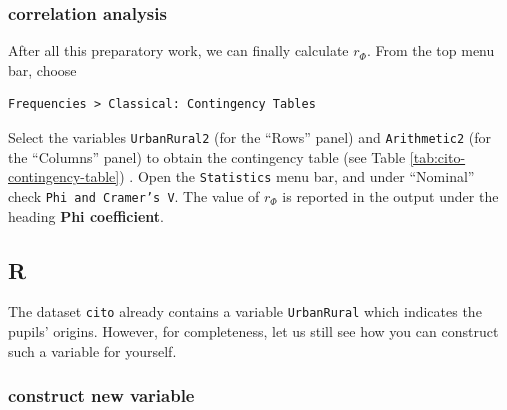 \documentclass[
]{book}
\newenvironment{Shaded}{\begin{snugshade}}{\end{snugshade}}
\newcommand{\CommentTok}[1]{\textcolor[rgb]{0.56,0.35,0.01}{\textit{#1}}}
\newcommand{\DecValTok}[1]{\textcolor[rgb]{0.00,0.00,0.81}{#1}}
\newcommand{\FunctionTok}[1]{\textcolor[rgb]{0.13,0.29,0.53}{\textbf{#1}}}
\newcommand{\NormalTok}[1]{#1}
\newcommand{\OtherTok}[1]{\textcolor[rgb]{0.56,0.35,0.01}{#1}}
\newcommand{\SpecialCharTok}[1]{\textcolor[rgb]{0.81,0.36,0.00}{\textbf{#1}}}
\begin{document}
\hypertarget{correlation-analysis-1}{%
\subsubsection{correlation analysis}\label{correlation-analysis-1}}

After all this preparatory work, we can finally calculate \(r_\Phi\). From the top menu bar, choose

\begin{verbatim}
Frequencies > Classical: Contingency Tables
\end{verbatim}

Select the variables \texttt{UrbanRural2} (for the ``Rows'' panel) and \texttt{Arithmetic2} (for the ``Columns'' panel) to obtain the contingency table (see Table \ref{tab:cito-contingency-table}) .
Open the \texttt{Statistics} menu bar, and under ``Nominal'' check \texttt{Phi\ and\ Cramer’s\ V}.
The value of \(r_\Phi\) is reported in the output under the heading \textbf{Phi coefficient}.

\hypertarget{r-10}{%
\subsection{R}\label{r-10}}

The dataset \texttt{cito} already contains a variable \texttt{UrbanRural} which indicates the pupils' origins.
However, for completeness, let us still see how you can construct such a variable for yourself.

\hypertarget{construct-new-variable-2}{%
\subsubsection{construct new variable}\label{construct-new-variable-2}}

\begin{Shaded}
\end{Shaded}
\end{document}
